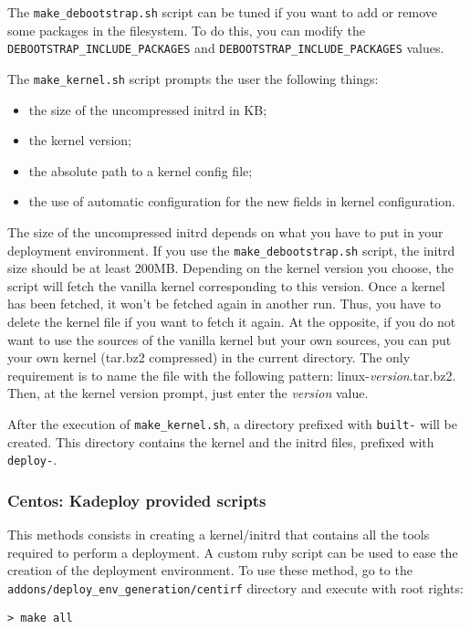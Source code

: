 \documentclass[a4wide,10pt,oneside]{book}
\begin{document}
The \texttt{make\_debootstrap.sh} script can be tuned if you want to add or remove some packages in the filesystem. To do this, you can modify the \texttt{DEBOOTSTRAP\_INCLUDE\_PACKAGES} and \texttt{DEBOOTSTRAP\_INCLUDE\_PACKAGES} values.

The \texttt{make\_kernel.sh} script prompts the user the following things:
\begin{itemize}
\item the size of the uncompressed initrd in KB;
\item the kernel version;
\item the absolute path to a kernel config file;
\item the use of automatic configuration for the new fields in kernel configuration.
\end{itemize}

The size of the uncompressed initrd depends on what you have to put in your deployment environment. If you use the \texttt{make\_debootstrap.sh} script, the initrd size should be at least 200MB.
Depending on the kernel version you choose, the script will fetch the vanilla kernel corresponding to this version. Once a kernel has been fetched, it won't be fetched again in another run. Thus, you have to delete the kernel file if you want to fetch it again. At the opposite, if you do not want to use the sources of the vanilla kernel but your own sources, you can put your own kernel (tar.bz2 compressed) in the current directory. The only requirement is to name the file with the following pattern: linux-\textit{version}.tar.bz2. Then, at the kernel version prompt, just enter the \textit{version} value.

After the execution of \texttt{make\_kernel.sh}, a directory prefixed with \texttt{built-} will be created. This directory contains the kernel and the initrd files, prefixed with \texttt{deploy-}.

\subsubsection{Centos: Kadeploy provided scripts}
This methods consists in creating a kernel/initrd that contains all the tools required to perform a deployment. A custom ruby script can be used to ease the creation of the deployment environment. To use these method, go to the \texttt{addons/deploy\_env\_generation/centirf} directory and execute with root rights:
\begin{small}
\begin{verbatim}
> make all
\end{verbatim}
\end{small}
\end{document}
